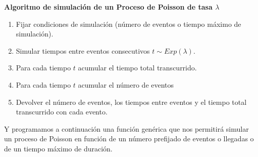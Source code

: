 \documentclass[
]{book}
\providecommand{\tightlist}{%
  \setlength{\itemsep}{0pt}\setlength{\parskip}{0pt}}
\newenvironment{silverbox}{
  \definecolor{shadecolor}{rgb}{192, 192, 192}  
  \color{black}
  \begin{shaded}}
 {\end{shaded}}
\theoremstyle{definition}
\theoremstyle{definition}
\theoremstyle{definition}
\theoremstyle{definition}
\theoremstyle{remark}
\begin{document}
\begin{silverbox}

\textbf{Algoritmo de simulación de un Proceso de Poisson de tasa \(\lambda\)}

\begin{enumerate}
\def\labelenumi{\arabic{enumi}.}
\tightlist
\item
  Fijar condiciones de simulación (número de eventos o tiempo máximo de simulación).
\item
  Simular tiempos entre eventos consecutivos \(t \sim Exp(\lambda)\).
\item
  Para cada tiempo \(t\) acumular el tiempo total transcurrido.
\item
  Para cada tiempo \(t\) acumular el número de eventos
\item
  Devolver el número de eventos, los tiempos entre eventos y el tiempo total transcurrido con cada evento.
\end{enumerate}

\end{silverbox}

Y programamos a continuación una función genérica que nos permitirá simular un proceso de Poisson en función de un número prefijado de eventos o llegadas o de un tiempo máximo de duración.
\end{document}
